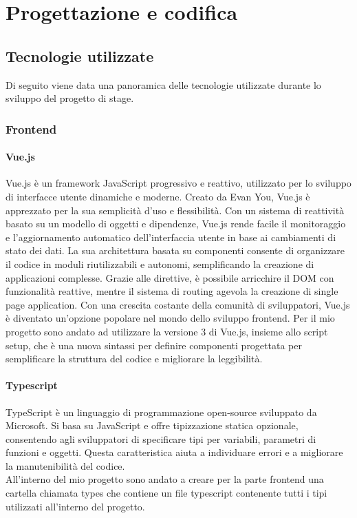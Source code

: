 \chapter{Progettazione e codifica}
\label{cap:progettazione-codifica}


\section{Tecnologie utilizzate}
\label{sec:tecnologie-strumenti}

Di seguito viene data una panoramica delle tecnologie utilizzate durante lo sviluppo del progetto di stage.

\subsection{Frontend}\label{subsec:frontend}
\subsubsection{Vue.js}\label{subsubsec:vue}
Vue.js è un framework JavaScript progressivo e reattivo, utilizzato per lo sviluppo di interfacce utente dinamiche e moderne. 
Creato da Evan You, Vue.js è apprezzato per la sua semplicità d'uso e flessibilità. Con un sistema di reattività basato su un modello di oggetti e dipendenze, 
Vue.js rende facile il monitoraggio e l'aggiornamento automatico dell'interfaccia utente in base ai cambiamenti di stato dei dati. La sua architettura basata 
su componenti consente di organizzare il codice in moduli riutilizzabili e autonomi, semplificando la creazione di applicazioni complesse. 
Grazie alle direttive, è possibile arricchire il DOM con funzionalità reattive, mentre il sistema di routing agevola la creazione di single page application. 
Con una crescita costante della comunità di sviluppatori, Vue.js è diventato un'opzione popolare nel mondo dello sviluppo frontend.
Per il mio progetto sono andato ad utilizzare la versione 3 di Vue.js, insieme allo script setup, che è una nuova sintassi per definire componenti progettata per semplificare la struttura del codice e migliorare la leggibilità.

\subsubsection{Typescript}\label{subsubsec:typescript}
TypeScript è un linguaggio di programmazione open-source sviluppato da Microsoft. Si basa su JavaScript e offre tipizzazione statica opzionale, 
consentendo agli sviluppatori di specificare tipi per variabili, parametri di funzioni e oggetti. Questa caratteristica aiuta a individuare errori e a migliorare 
la manutenibilità del codice.\\
All'interno del mio progetto sono andato a creare per la parte frontend una cartella chiamata types che contiene un file typescript contenente tutti i tipi utilizzati all'interno del progetto.
